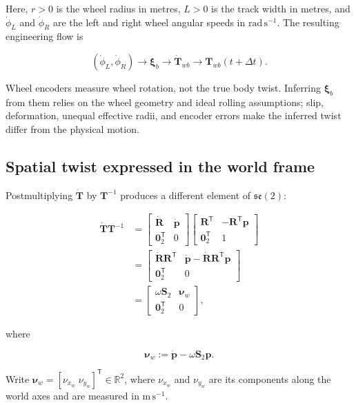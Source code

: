 \documentclass[
  australian,
  12pt,
  letterpaper,
  DIV=11,
  numbers=noendperiod,
  twoside]{scrreprt}
\begin{document}
Here, \(r>0\) is the wheel radius in metres, \(L>0\) is the track width
in metres, and \(\dot\phi_L\) and \(\dot\phi_R\) are the left and right
wheel angular speeds in \(\mathrm{rad\,s^{-1}}\). The resulting
engineering flow is

\[
(\dot\phi_L,\dot\phi_R)
\longrightarrow
\boldsymbol\xi_b
\longrightarrow
\dot{\mathbf T}_{wb}
\longrightarrow
\mathbf T_{wb}(t+\Delta t).
\]

Wheel encoders measure wheel rotation, not the true body twist.
Inferring \(\boldsymbol\xi_b\) from them relies on the wheel geometry
and ideal rolling assumptions; slip, deformation, unequal effective
radii, and encoder errors make the inferred twist differ from the
physical motion.

\subsection{Spatial twist expressed in the world
frame}\label{sec-se2-spatial-twist}

Postmultiplying \(\dot{\mathbf T}\) by \(\mathbf T^{-1}\) produces a
different element of \(\mathfrak{se}(2)\):

\[
\begin{aligned}
\dot{\mathbf T}\mathbf T^{-1}
&=
\begin{bmatrix}
\dot{\mathbf R}&\dot{\mathbf p}\\
\mathbf 0_2^\mathsf T&0
\end{bmatrix}
\begin{bmatrix}
\mathbf R^\mathsf T&-\mathbf R^\mathsf T\mathbf p\\
\mathbf 0_2^\mathsf T&1
\end{bmatrix}\\
&=
\begin{bmatrix}
\dot{\mathbf R}\mathbf R^\mathsf T&
\dot{\mathbf p}-\dot{\mathbf R}\mathbf R^\mathsf T\mathbf p\\
\mathbf 0_2^\mathsf T&0
\end{bmatrix}\\
&=
\begin{bmatrix}
\omega\mathbf S_2&\boldsymbol\nu_w\\
\mathbf 0_2^\mathsf T&0
\end{bmatrix},
\end{aligned}
\]

where

\[
\boxed{
\boldsymbol\nu_w
\mathrel{:=}
\dot{\mathbf p}
-
\omega\mathbf S_2\mathbf p
}.
\]

Write
\(\boldsymbol\nu_w=[\nu_{x_w}\;\nu_{y_w}]^\mathsf T\in\mathbb R^2\),
where \(\nu_{x_w}\) and \(\nu_{y_w}\) are its components along the world
axes and are measured in \(\mathrm{m\,s^{-1}}\).
\end{document}
